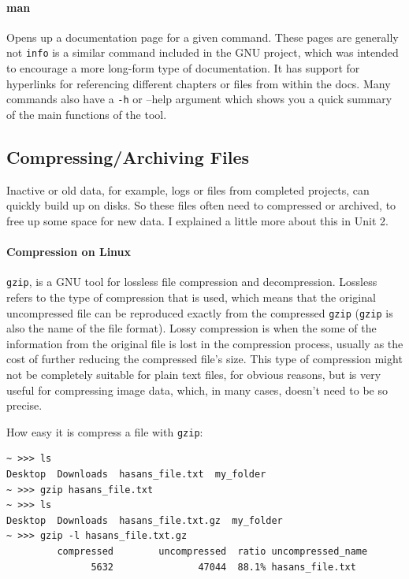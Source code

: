 \hypertarget{man}{%
\paragraph{man}\label{man}}

Opens up a documentation page for a given command. These pages are generally not \texttt{info} is a similar command included in the GNU project, which was intended to encourage a more long-form type of documentation. It has support for hyperlinks for referencing different chapters or files from within the docs. Many commands also have a \texttt{-h} or --help argument which shows you a quick summary of the main functions of the tool.

\hypertarget{compressingarchiving-files}{%
\subsection{Compressing/Archiving Files}\label{compressingarchiving-files}}

Inactive or old data, for example, logs or files from completed projects, can quickly build up on disks. So these files often need to compressed or archived, to free up some space for new data. I explained a little more about this in Unit 2.

\hypertarget{compression-on-linux}{%
\paragraph{Compression on Linux}\label{compression-on-linux}}

\texttt{gzip}, is a GNU tool for lossless file compression and decompression. Lossless refers to the type of compression that is used, which means that the original uncompressed file can be reproduced exactly from the compressed \texttt{gzip} (\texttt{gzip} is also the name of the file format). Lossy compression is when the some of the information from the original file is lost in the compression process, usually as the cost of further reducing the compressed file's size. This type of compression might not be completely suitable for plain text files, for obvious reasons, but is very useful for compressing image data, which, in many cases, doesn't need to be so precise.

How easy it is compress a file with \texttt{gzip}:

\begin{verbatim}
~ >>> ls
Desktop  Downloads  hasans_file.txt  my_folder
~ >>> gzip hasans_file.txt
~ >>> ls
Desktop  Downloads  hasans_file.txt.gz  my_folder
~ >>> gzip -l hasans_file.txt.gz
         compressed        uncompressed  ratio uncompressed_name
               5632               47044  88.1% hasans_file.txt
\end{verbatim}


